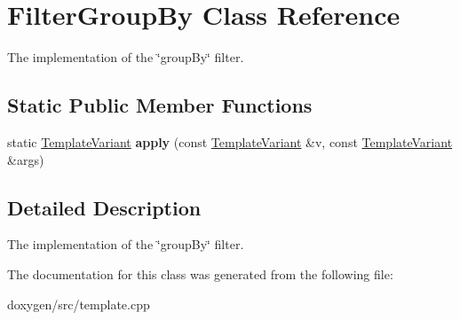 \hypertarget{class_filter_group_by}{}\section{Filter\+Group\+By Class Reference}
\label{class_filter_group_by}


The implementation of the \char`\"{}group\+By\char`\"{} filter.  


\subsection*{Static Public Member Functions}
\begin{DoxyCompactItemize}
\item 
\mbox{\label{class_filter_group_by_aafbd23e7f7c3982ad4f9f362565db8a6}} 
static \mbox{\hyperlink{class_template_variant}{Template\+Variant}} {\bfseries apply} (const \mbox{\hyperlink{class_template_variant}{Template\+Variant}} \&v, const \mbox{\hyperlink{class_template_variant}{Template\+Variant}} \&args)
\end{DoxyCompactItemize}


\subsection{Detailed Description}
The implementation of the \char`\"{}group\+By\char`\"{} filter. 

The documentation for this class was generated from the following file\+:\begin{DoxyCompactItemize}
\item 
doxygen/src/template.\+cpp\end{DoxyCompactItemize}
